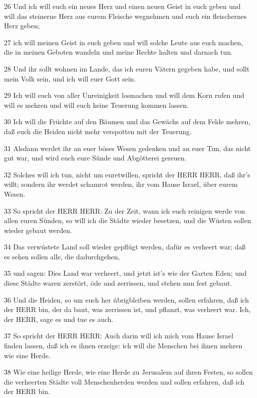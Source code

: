 \par 26 Und ich will euch ein neues Herz und einen neuen Geist in euch geben und will das steinerne Herz aus eurem Fleische wegnehmen und euch ein fleischernes Herz geben;
\par 27 ich will meinen Geist in euch geben und will solche Leute aus euch machen, die in meinen Geboten wandeln und meine Rechte halten und darnach tun.
\par 28 Und ihr sollt wohnen im Lande, das ich euren Vätern gegeben habe, und sollt mein Volk sein, und ich will euer Gott sein.
\par 29 Ich will euch von aller Unreinigkeit losmachen und will dem Korn rufen und will es mehren und will euch keine Teuerung kommen lassen.
\par 30 Ich will die Früchte auf den Bäumen und das Gewächs auf dem Felde mehren, daß euch die Heiden nicht mehr verspotten mit der Teuerung.
\par 31 Alsdann werdet ihr an euer böses Wesen gedenken und an euer Tun, das nicht gut war, und wird euch eure Sünde und Abgötterei gereuen.
\par 32 Solches will ich tun, nicht um euretwillen, spricht der HERR HERR, daß ihr's wißt; sondern ihr werdet schamrot werden, ihr vom Hause Israel, über eurem Wesen.
\par 33 So spricht der HERR HERR: Zu der Zeit, wann ich euch reinigen werde von allen euren Sünden, so will ich die Städte wieder besetzen, und die Wüsten sollen wieder gebaut werden.
\par 34 Das verwüstete Land soll wieder gepflügt werden, dafür es verheert war; daß es sehen sollen alle, die dadurchgehen,
\par 35 und sagen: Dies Land war verheert, und jetzt ist's wie der Garten Eden; und diese Städte waren zerstört, öde und zerrissen, und stehen nun fest gebaut.
\par 36 Und die Heiden, so um euch her übrigbleiben werden, sollen erfahren, daß ich der HERR bin, der da baut, was zerrissen ist, und pflanzt, was verheert war. Ich, der HERR, sage es und tue es auch.
\par 37 So spricht der HERR HERR: Auch darin will ich mich vom Hause Israel finden lassen, daß ich es ihnen erzeige: ich will die Menschen bei ihnen mehren wie eine Herde.
\par 38 Wie eine heilige Herde, wie eine Herde zu Jerusalem auf ihren Festen, so sollen die verheerten Städte voll Menschenherden werden und sollen erfahren, daß ich der HERR bin.

